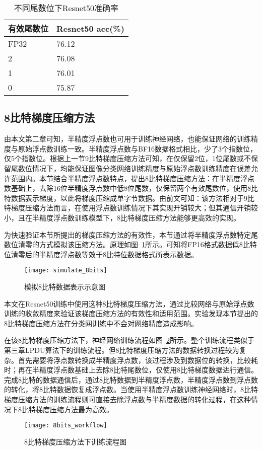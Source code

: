 \begin{table}[htb]
\centering
\noindent\begin{minipage}{0.6\textwidth}
\centering
\caption{不同尾数位下Resnet50准确率}
\label{tab:simulate_11_10_9bits_acc}
\begin{tabular}{p{2cm}p{2.5cm}}
\toprule[1.5pt]
有效尾数位 & Resnet50 acc(\%) \\\midrule[1pt]
FP32 & 76.12 \\
2 & 76.08 \\
1 & 76.01 \\
0 & 75.87 \\
\midrule[1pt]
\end{tabular}
\end{minipage}
\end{table}

\subsection{8比特梯度压缩方法}
由本文第二章可知，半精度浮点数也可用于训练神经网络，也能保证网络的训练精度与原始浮点数训练一致。半精度浮点数与BF16数据格式相比，少了3个指数位，仅5个指数位。根据上一节9比特梯度压缩方法可知，在仅保留2位，1位尾数或不保留尾数位情况下，均能保证图像分类网络训练精度与原始浮点数训练精度在误差允许范围内。本节结合半精度浮点数特点，提出8比特梯度压缩方法：在半精度浮点数基础上，去除16位半精度浮点数中低8位尾数，仅保留两个有效尾数位，使用8比特数据表示梯度，以此将梯度压缩成单字节数据。由前文可知：该方法相对于9比特梯度压缩方法而言，在使用浮点数训练情况下其实现开销较大；但其通信开销较小，且在半精度浮点数训练模型下，8比特梯度压缩方法能够更高效的实现。

为快速验证本节所提出的梯度压缩方法的有效性，本节通过将半精度浮点数特定尾数位清零的方式模拟该压缩方法。原理如图~\ref{fig:simulate_8bits}所示。可知将FP16格式数据低8比特位清零后的半精度浮点数等效于8比特位数据格式所表示数据。

\begin{figure}[htp]
\centering
\texttt{[image: simulate\_8bits]}
\caption{模拟8比特数据表示示意图}
\label{fig:simulate_8bits}
\end{figure}

本文在Resnet50训练中使用这种8比特梯度压缩方法，通过比较网络与原始浮点数训练的收敛精度来验证该梯度压缩方法的有效性和适用范围。实验发现本节提出的8比特梯度压缩方法在分类网训练中不会对网络精度造成影响。

在该8比特梯度压缩方法下，神经网络训练流程如图~\ref{fig:8bits_workflow}所示。整个训练流程类似于第三章LPDU算法下的训练流程。但8比特梯度压缩方法的数据转换过程较为复杂。首先需要将浮点数转换成半精度浮点数，该过程涉及到数据位的转换，比较耗时；再在半精度浮点数基础上去除8比特尾数位，仅使用8比特梯度数据进行通信。完成8比特的数据通信后，通过8比特数据到半精度浮点数，半精度浮点数到浮点数的转化，将8比特数据恢复成浮点数。当使用半精度浮点数训练神经网络时，8比特梯度压缩方法的训练流程则可直接去除浮点数与半精度数据的转化过程，在这种情况下8比特梯度压缩方法最为高效。
\begin{figure}[htp]
\centering
\texttt{[image: 8bits\_workflow]}
\caption{8比特梯度压缩方法下训练流程图}
\label{fig:8bits_workflow}
\end{figure}

